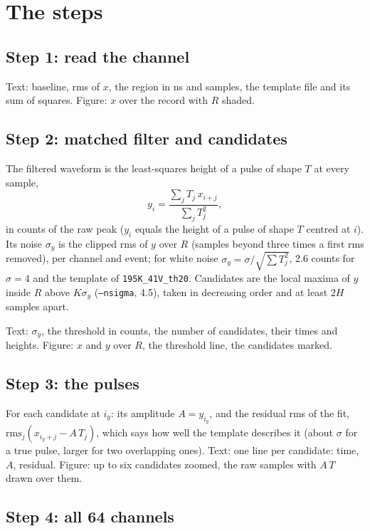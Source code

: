 \documentclass[11pt]{article}
\newcommand{\code}[1]{\texttt{#1}}
\begin{document}
\section{The steps}

\subsection{Step 1: read the channel}

Text: baseline, rms of $x$, the region in ns and samples, the template
file and its sum of squares. Figure: $x$ over the record with $R$ shaded.

\subsection{Step 2: matched filter and candidates}

The filtered waveform is the least-squares height of a pulse of shape $T$
at every sample,
\[
  y_i = \frac{\sum_j T_j\, x_{i+j}}{\sum_j T_j^2},
\]
in counts of the raw peak ($y_i$ equals the height of a pulse of shape $T$
centred at $i$). Its noise $\sigma_y$ is the clipped rms of $y$ over $R$
(samples beyond three times a first rms removed), per channel and event;
for white noise $\sigma_y = \sigma / \sqrt{\sum T_j^2}$, 2.6 counts for
$\sigma = 4$ and the template of \code{195K\_41V\_th20}. Candidates are the
local maxima of $y$ inside $R$ above $K \sigma_y$ (\code{--nsigma}, 4.5),
taken in decreasing order and at least $2H$ samples apart.

Text: $\sigma_y$, the threshold in counts, the number of candidates, their
times and heights. Figure: $x$ and $y$ over $R$, the threshold line, the
candidates marked.

\subsection{Step 3: the pulses}

For each candidate at $i_y$: its amplitude $A = y_{i_y}$, and the residual
rms of the fit, $\mathrm{rms}_j (x_{i_y + j} - A\,T_j)$, which says how
well the template describes it (about $\sigma$ for a true pulse, larger
for two overlapping ones). Text: one line per candidate: time, $A$,
residual. Figure: up to six candidates zoomed, the raw samples with
$A\,T$ drawn over them.

\subsection{Step 4: all 64 channels}
\end{document}
